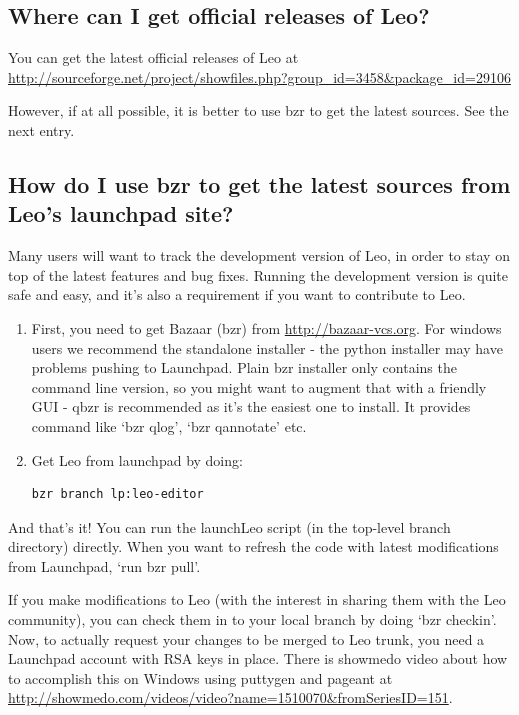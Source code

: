 \documentclass[a4paper,10pt,english]{sphinxmanual}
\begin{document}
\subsection{Where can I get official releases of Leo?}
\label{FAQ:where-can-i-get-official-releases-of-leo}
You can get the latest official releases of Leo at
\href{http://sourceforge.net/project/showfiles.php?group\_id=3458\&package\_id=29106}{http://sourceforge.net/project/showfiles.php?group\_id=3458\&package\_id=29106}

However, if at all possible, it is better to use bzr to get the latest sources.  See the next entry.


\subsection{How do I use bzr to get the latest sources from Leo's launchpad site?}
\label{FAQ:how-do-i-use-bzr-to-get-the-latest-sources-from-leo-s-launchpad-site}
Many users will want to track the development version of Leo, in order to stay
on top of the latest features and bug fixes. Running the development version is
quite safe and easy, and it's also a requirement if you want to contribute to
Leo.
\begin{enumerate}
\item {} 
First, you need to get Bazaar (bzr) from \href{http://bazaar-vcs.org}{http://bazaar-vcs.org}. For windows
users we recommend the standalone installer - the python installer may have
problems pushing to Launchpad. Plain bzr installer only contains the command
line version, so you might want to augment that with a friendly GUI - qbzr is
recommended as it's the easiest one to install. It provides command like
`bzr qlog', `bzr qannotate' etc.

\item {} 
Get Leo from launchpad by doing:

\begin{Verbatim}[commandchars=\\\{\}]
bzr branch lp:leo-editor
\end{Verbatim}

\end{enumerate}

And that's it! You can run the launchLeo script (in the top-level branch directory) directly.
When you want to refresh the code with latest modifications from Launchpad, `run bzr pull'.

If you make modifications to Leo (with the interest in sharing them with the Leo
community), you can check them in to your local branch by doing `bzr checkin'.
Now, to actually request your changes to be merged to Leo trunk, you need a
Launchpad account with RSA keys in place. There is showmedo video about how to
accomplish this on Windows using puttygen and pageant at
\href{http://showmedo.com/videos/video?name=1510070\&fromSeriesID=151}{http://showmedo.com/videos/video?name=1510070\&fromSeriesID=151}.
\end{document}
